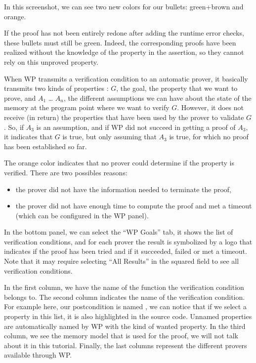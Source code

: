 In this screenshot, we can see two new colors for our bullets:
green+brown and orange.



If the proof has not been entirely redone after adding the runtime error
checks, these bullets must still be green. Indeed, the corresponding
proofs have been realized without the knowledge of the property in the
assertion, so they cannot rely on this unproved property.



When WP transmits a verification condition to an automatic prover, it
basically transmits two kinds of properties : $G$, the goal, the
property that we want to prove, and $A_1$ \ldots{} $A_n$, the
different assumptions we can have about the state of the memory at the
program point where we want to verify $G$. However, it does not
receive (in return) the properties that have been used by the prover to
validate $G$. So, if $A_3$ is an assumption, and if WP did not
succeed in getting a proof of $A_3$, it indicates that $G$ is true,
but only assuming that $A_3$ is true, for which no proof has been established
so far.



The orange color indicates that no prover could determine if the
property is verified. There are two possibles reasons:
\begin{itemize}
\item the prover did not have the information needed to terminate the proof,
\item the prover did not have enough time to compute the proof and
  met a timeout (which can be configured in the WP panel).
\end{itemize}


In the bottom panel, we can select the ``WP Goals'' tab, it shows the list of
verification conditions, and for each prover the result is symbolized
by a logo that indicates if the proof has been tried and if it
succeeded, failed or met a timeout. Note that it
may require selecting ``All Results'' in the squared field to see all
verification conditions.




In the first column, we have the name of the function the verification
condition belongs to. The second column indicates the name of the verification
condition. For example here, our postcondition is named
, we can notice
that if we select a property in this list, it is also highlighted in the
source code. Unnamed properties are automatically named by WP with the
kind of wanted property. In the third column, we see the memory model
that is used for the proof, we will not talk about it in this tutorial.
Finally, the last columns represent the different provers available
through WP.



